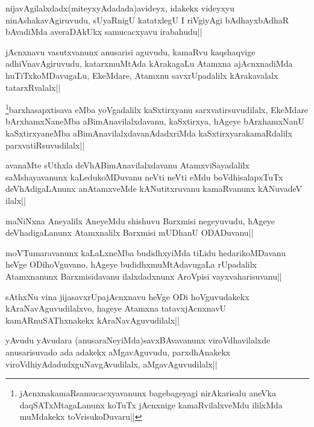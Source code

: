 \begin{artha}
nijavAgilalxdadx(miteyxyAdadada)avideyx, idakekx videyxyu ninAshakavAgiruvudu, sUyaRnigU katatxlegU I riVgiyAgi bAdhayxbAdhaR bAvadiMda averaDAkUkx samucacxyavu irabahudu||
\end{artha}

\begin{artha}
jAcnxnavu vasutxvanunx anusarisi aguvudu, kamaRvu kaqshaqvige adhiVnavAgiruvudu, katarxmuMtAda kArakagaLu Atamxna ajAcnxnadiMda huTiTxkoMDavugaLu, EkeMdare, Atamxnu savxrUpadalilx kArakavalalx tatarxRvalalx||
\end{artha}

\begin{artha}
\footnote{jAcnxnakamaRsamucacxyavanunx bagebageyagi nirAkarisalu aneVka daqSATxMtagaLanunx koTuTx jAcnxnige kamaRvilalxveMdu ililxMda muMdakekx toVrisukoDuvaru||}barxhasapxtisava eMba yoVgadalilx kaSxtirxyanu sarxvatirsuvudilalx, EkeMdare bArxhamxNaneMba aBimAnavilalxdavanu, kaSxtirxya, hAgeye bArxhamxNanU  kaSxtirxyaneMba aBimAnavilalxdavanAdadxriMda kaSxtirxyarakamaRdalilx parxvatiRsuvudilalx||
\end{artha}

\begin{artha}
avanaMte sUthxla deVhABimAnavilalxdavanu AtamxviSayadalilx saMshayavanunx kaLedukoMDuvanu neVti neVti eMdu boVdhisalapxTuTx deVhAdigaLAnunx anAtamxveMde kANutitxruvanu kamaRvanunx kANuvadeV ilalx||
\end{artha}

\begin{artha}
maNiNxna Aneyalilx AneyeMdu shishuvu Barxmisi negeyuvudu, hAgeye deVhadigaLanunx Atamxnalilx Barxmisi mUDhanU ODADuvanu||
\end{artha}

\begin{artha}
moVTumaravanunx kaLaLxneMba budidhxyiMda tiLidu hedarikoMDavanu heVge ODihoVguvano, hAgeye budidhxmuMtAdavugaLa rUpadalilx Atamxnanunx Barxmisidavanu ilalxdadxnunx AroVpisi vayxvaharisuvanu||
\end{artha}

\begin{artha}
sAthxNu vina jijasavxrUpajAcnxnavu heVge ODi hoVguvudakekx kAraNavAguvudilalxvo, hageye Atamxna tatavxjAcnxnavU kamARnuSAThxnakekx kAraNavAguvudilalx||
\end{artha}


\begin{artha}
yAvudu yAvudara (anusaraNeyiMda)savxBAvavanunx viroVdhavilalxde anusarisuvado ada adakekx aMgavAguvudu, parxdhAnakekx viroVdhiyAdadudxguNavgAvudilalx, aMgavAguvudilalx||
\end{artha}

